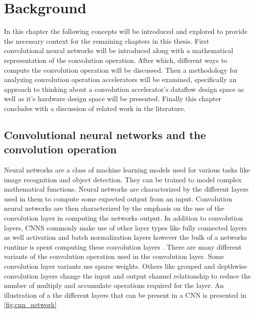 \chapter{Background}
\label{chap:background:intro}

In this chapter the following concepts will be introduced and explored to
provide the necessary context for the remaining chapters in this thesis. First
convolutional neural networks will be introduced along with a mathematical
representation of the convolution operation. After which, different ways to
compute the convolution operation will be discussed. Then a methodology for
analyzing convolution operation accelerators will be examined, specifically an
approach to thinking about a convolution accelerator's dataflow design space as
well as it's hardware design space will be presented. Finally this chapter
concludes with a discussion of related work in the literature. 


\clearpage

\section{Convolutional neural networks and the convolution operation}
\label{chap:background:cnns_and_conv}

Neural networks are a class of machine learning models used for various tasks
like image recognition and object detection. They can be trained to model
complex mathematical functions. Neural networks are characterized by the
different layers used in them to compute some expected output from an input.
Convolution neural networks are then characterized by the emphasis on the use of
the convolution layer in computing the networks output. In addition to
convolution layers, CNNS commonly make use of other layer types like fully
connected layers as well activation and batch normalization layers
however the bulk of a networks runtime is spent computing these convolution
layers \cite{most_of_the_runtime}. There are many different variants of the
convolution operation used in the convolution layer. Some convolution layer
variants use sparse weights. Others like grouped and depthwise convolution
layers change the input and output channel relationship to reduce the number of
multiply and accumulate operations required for the layer. An illustration of a
the different layers that can be present in a CNN is presented in
\autoref{fig:cnn_network}

